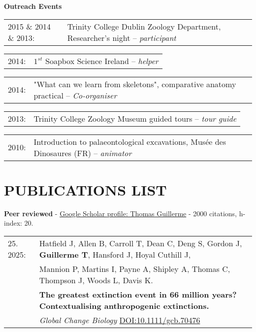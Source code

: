 \documentclass[10pt,a4paper]{article}
\begin{document}
{\raggedright\textbf{Outreach Events}\\
\begin{tabular}{lp{13cm}}
2015 \& 2014 \& 2013: & Trinity College Dublin Zoology Department, Researcher's night -- \textit{participant}\\
\end{tabular}
\begin{tabular}{ll}
2014: & $1^{st}$ Soapbox Science Ireland -- \textit{helper}\\
\end{tabular}
\begin{tabular}{ll}
2014: & "What can we learn from skeletons", comparative anatomy practical -- \textit{Co-organiser}\\
\end{tabular}
\begin{tabular}{ll}
2013: & Trinity College Zoology Museum guided tours -- \textit{tour guide}\\
\end{tabular}
\begin{tabular}{ll}
2010: & Introduction to palaeontological excavations, Mus\'{e}e des Dinosaures (FR) -- \textit{animator}\\
\end{tabular}
\bigskip

\section{PUBLICATIONS LIST}
\raggedright\textbf{Peer reviewed} - \href{https://scholar.google.co.uk/citations?user=LA9l9EkAAAAJ&hl=en}{Google Scholar profile: Thomas Guillerme} - 2000 citations, h-index: 20.\\[1.5ex]

\begin{tabular}{ll}
25. 2025:  & Hatfield J, Allen B, Carroll T, Dean C, Deng S, Gordon J, \textbf{Guillerme T}, Hansford J, Hoyal Cuthill J, \\
      & Mannion P, Martins I, Payne A, Shipley A, Thomas C, Thompson J, Woods L, Davis K. \\
      & \textbf{The greatest extinction event in 66 million years? Contextualising anthropogenic extinctions.}\\
      & \textit{Global Change Biology} \href{https://onlinelibrary.wiley.com/doi/abs/10.1111/gcb.70476}{DOI:10.1111/gcb.70476}\\ 
\end{tabular}
\bigskip

}
\end{document}
